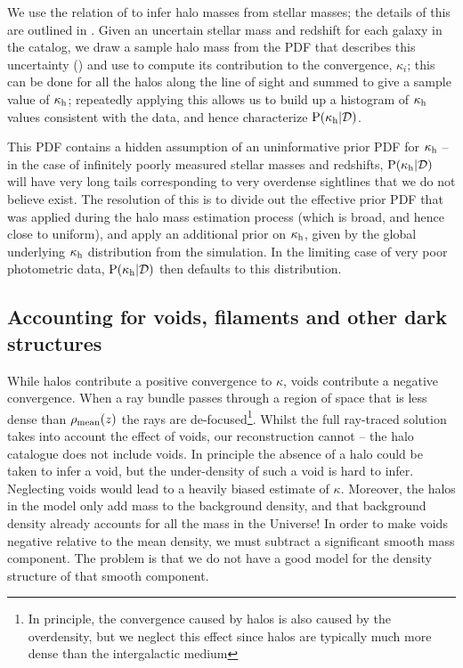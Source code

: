 \documentclass[useAMS,usenatbib]{mn2e}
\begin{document}
We use the relation of \citet{BehrooziEtal2010} to infer halo masses
from stellar masses; the details of this \proceedure are outlined in 
. Given an uncertain stellar mass and redshift for
each galaxy in the  catalog, we draw a sample halo mass from the PDF
that describes this uncertainty  ()  and use
 to compute its contribution to the convergence,
$\kappa_i$; this can be done for all the halos along the line of sight
and summed to give a sample value of $\kappa_{\rm h}$;  repeatedly applying
this \proceedure allows us to build up a histogram of $\kappa_{\rm h}$ values
consistent with the data, and hence characterize ${\rm P}(\kappa_{\rm h}|{\mathcal{D}})$. 

This PDF contains a hidden assumption of an uninformative prior PDF for
$\kappa_{\rm h}$ -- in the case of infinitely poorly measured stellar masses and
redshifts, ${\rm P}(\kappa_{\rm h}|{\mathcal{D}})$ will have very long tails corresponding to
very overdense sightlines that we do not believe exist. The resolution of this
is to divide out the effective prior PDF that was applied during the halo mass
estimation process (which is broad, and hence close to uniform), and apply an
additional prior on $\kappa_{\rm h}$, given by the global underlying $\kappa_{\rm h}$
distribution from the simulation. In the limiting  case of very poor
photometric data, ${\rm P}(\kappa_{\rm h}|{\mathcal{D}})$ then defaults to this distribution.




\subsection{Accounting for voids, filaments and other dark structures}
\label{sec:model:voids}

While halos contribute a positive convergence to $\kappa$, voids contribute
a negative convergence. When a ray bundle passes through a  region of space
that is less dense than $\rho_{\rm mean}(z)$ the rays are de-focused\footnote{In
principle, the convergence caused by halos is also caused by the overdensity,
but we neglect this effect since halos are typically much more dense than the
intergalactic medium}. Whilst the  full ray-traced solution takes into account
the effect of voids, our reconstruction cannot -- the halo catalogue does not
include voids. In principle the absence of a halo could be taken to infer a
void, but the under-density of such a void is hard to infer. Neglecting voids
would lead to a heavily biased estimate of $\kappa$. Moreover, the halos in 
the model only add mass to the background density, and that background density
already accounts for all the mass in the Universe! In order to make voids
negative relative to the mean density, we must subtract a significant smooth
mass component. The problem is that we do not have a good model for the
density structure of that smooth component. 
\end{document}
